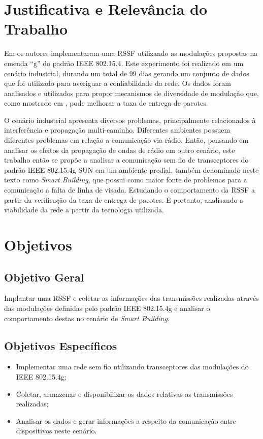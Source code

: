 \section{Justificativa e Relevância do Trabalho}
\label{sec:justificativa}
Em \cite{tuset2020dataset} os autores implementaram uma RSSF utilizando as modulações propostas na emenda ``g'' do padrão IEEE 802.15.4. Este experimento foi realizado em um cenário industrial, durando um total de 99 dias gerando um conjunto de dados que foi utilizado para averiguar a confiabilidade da rede. Os dados foram analisados e utilizados para propor mecanismos de diversidade de modulação que, como mostrado em \cite{gomes2020improving}, pode melhorar a taxa de entrega de pacotes.

O cenário industrial apresenta diversos problemas, principalmente relacionados à interferência e propagação multi-caminho. Diferentes ambientes possuem diferentes problemas em relação a comunicação via rádio. Então, pensando em analisar os efeitos da propagação de ondas de rádio em outro cenário, este trabalho então se propõe a analisar a comunicação sem fio de transceptores do padrão IEEE 802.15.4g SUN em um ambiente predial, também denominado neste texto como \emph{Smart Building}, que possui como maior fonte de problemas para a comunicação a falta de linha de visada. Estudando o comportamento da RSSF a partir da verificação da taxa de entrega de pacotes. E portanto, analisando a viabilidade da rede a partir da tecnologia utilizada.

\section{Objetivos}
\label{sec:objetivos}

\subsection{Objetivo Geral}
\label{subsec:objGeral}
Implantar uma RSSF e coletar as informações das transmissões realizadas através das modulações definidas pelo padrão IEEE 802.15.4g e analisar o comportamento destas no cenário de \emph{Smart Building}.


\subsection{Objetivos Específicos}
\label{subsec:objespecificos}
\begin{itemize}
    \item Implementar uma rede sem fio utilizando transceptores das modulações do IEEE 802.15.4g;
    \item Coletar, armazenar e disponibilizar os dados relativas as transmissões realizadas;
    \item Analisar os dados e gerar informações a respeito da comunicação entre dispositivos neste cenário.
\end{itemize}


